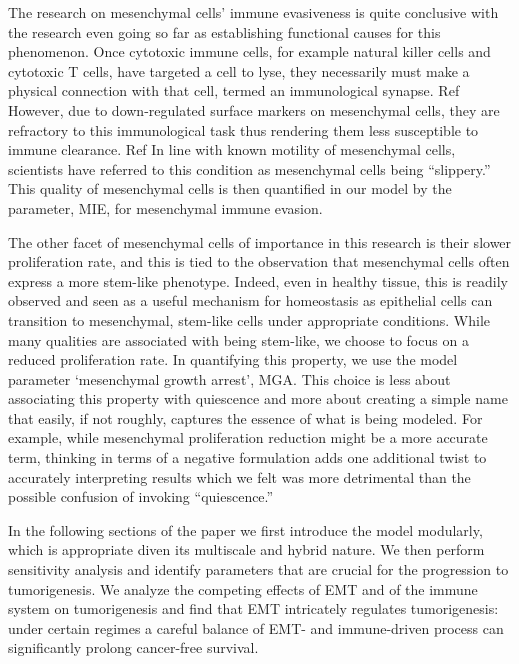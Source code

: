 \documentclass{article}
\begin{document}
The research on mesenchymal cells' immune evasiveness is quite conclusive with the research even going so far as establishing functional causes for this phenomenon.
Once cytotoxic immune cells, for example natural killer cells and cytotoxic T cells, have targeted a cell to lyse, they necessarily must make a physical connection with that cell, termed an immunological synapse. Ref 
However, due to down-regulated surface markers on mesenchymal cells, they are refractory to this immunological task thus rendering them less susceptible to immune clearance. Ref 
In line with known motility of mesenchymal cells, scientists have referred to this condition as mesenchymal cells being ``slippery.''
This quality of mesenchymal cells is then quantified in our model by the parameter, MIE, for mesenchymal immune evasion.

The other facet of mesenchymal cells of importance in this research is their slower proliferation rate, and this is tied to the observation that mesenchymal cells often express a more stem-like phenotype.
Indeed, even in healthy tissue, this is readily observed and seen as a useful mechanism for homeostasis as epithelial cells can transition to mesenchymal, stem-like cells under appropriate conditions.
While many qualities are associated with being stem-like, we choose to focus on a reduced proliferation rate.
In quantifying this property, we use the model parameter `mesenchymal growth arrest', MGA.
This choice is less about associating this property with quiescence and more about creating a simple name that easily, if not roughly, captures the essence of what is being modeled.
For example, while mesenchymal proliferation reduction might be a more accurate term, thinking in terms of a negative formulation adds one additional twist to accurately interpreting results which we felt was more detrimental than the possible confusion of invoking ``quiescence.''

In the following sections of the paper we first introduce the model modularly, which is appropriate diven its multiscale and hybrid nature. We then perform sensitivity analysis and identify parameters that are crucial for the progression to tumorigenesis. We analyze the competing effects of EMT and of the immune system on tumorigenesis and find that EMT intricately regulates tumorigenesis: under certain regimes a careful balance of EMT- and immune-driven process can significantly prolong cancer-free survival.   



\end{document}
